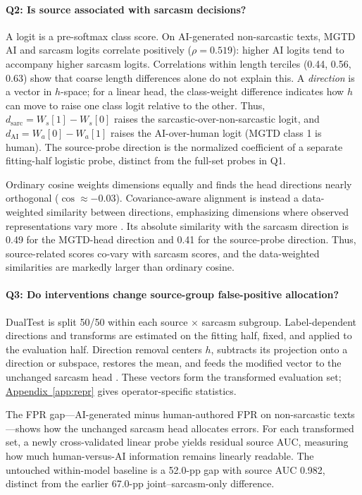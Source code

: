 \documentclass[11pt]{article}
\newcommand{\Appref}[1]{\hyperref[#1]{Appendix~\ref*{#1}}}
\begin{document}
\paragraph{Q2: Is source associated with sarcasm decisions?} A logit is a pre-softmax class score. On AI-generated non-sarcastic texts, MGTD AI and sarcasm logits correlate positively ($\rho=0.519$): higher AI logits tend to accompany higher sarcasm logits. Correlations within length terciles (0.44, 0.56, 0.63) show that coarse length differences alone do not explain this. A \emph{direction} is a vector in $h$-space; for a linear head, the class-weight difference indicates how $h$ can move to raise one class logit relative to the other. Thus, $d_{\mathrm{sarc}}=W_s[1]-W_s[0]$ raises the sarcastic-over-non-sarcastic logit, and $d_{\mathrm{AI}}=W_a[0]-W_a[1]$ raises the AI-over-human logit (MGTD class 1 is human). The source-probe direction is the normalized coefficient of a separate fitting-half logistic probe, distinct from the full-set probes in Q1.

Ordinary cosine weights dimensions equally and finds the head directions nearly orthogonal ($\cos\approx-0.03$). Covariance-aware alignment is instead a data-weighted similarity between directions, emphasizing dimensions where observed representations vary more \citep{ledoit2004covariance}. Its absolute similarity with the sarcasm direction is 0.49 for the MGTD-head direction and 0.41 for the source-probe direction. Thus, source-related scores co-vary with sarcasm scores, and the data-weighted similarities are markedly larger than ordinary cosine.

\paragraph{Q3: Do interventions change source-group false-positive allocation?} DualTest is split 50/50 within each source $\times$ sarcasm subgroup. Label-dependent directions and transforms are estimated on the fitting half, fixed, and applied to the evaluation half. Direction removal centers $h$, subtracts its projection onto a direction or subspace, restores the mean, and feeds the modified vector to the unchanged sarcasm head \citep{elazar2021amnesic}. These vectors form the transformed evaluation set; \Appref{app:repr} gives operator-specific statistics.

The FPR gap---AI-generated minus human-authored FPR on non-sarcastic texts---shows how the unchanged sarcasm head allocates errors. For each transformed set, a newly cross-validated linear probe yields residual source AUC, measuring how much human-versus-AI information remains linearly readable. The untouched within-model baseline is a 52.0-pp gap with source AUC 0.982, distinct from the earlier 67.0-pp joint--sarcasm-only difference.
\end{document}
